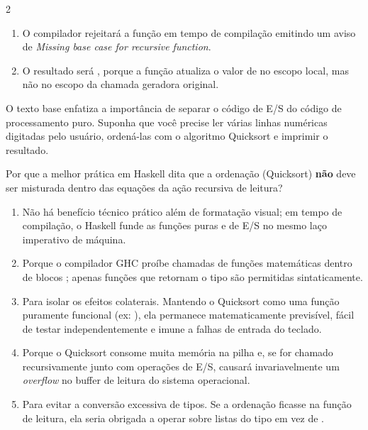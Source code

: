 \documentclass[a4paper,10pt,brazil]{article}
\begin{document}
\begin{multicols}{2}
\begin{enumerate}
  \item O compilador rejeitará a função  em tempo de compilação emitindo um aviso de \emph{Missing base case for recursive function}.

  \item O resultado será \haskellinline{[10, 10, 10]}, porque a função atualiza o valor de  no escopo local, mas não no escopo da chamada geradora original.


\end{enumerate}

O texto base enfatiza a importância de separar o código de E/S do código de processamento puro. Suponha que você precise ler várias linhas numéricas digitadas pelo usuário, ordená-las com o algoritmo Quicksort e imprimir o resultado. 

Por que a melhor prática em Haskell dita que a ordenação (Quicksort) \textbf{não} deve ser misturada dentro das equações da ação recursiva de leitura?

\begin{enumerate}
  \item Não há benefício técnico prático além de formatação visual; em tempo de compilação, o Haskell funde as funções puras e de E/S no mesmo laço imperativo de máquina.

  \item Porque o compilador GHC proíbe chamadas de funções matemáticas dentro de blocos ; apenas funções que retornam o tipo  são permitidas sintaticamente.

  \item Para isolar os efeitos colaterais. Mantendo o Quicksort como uma função puramente funcional (ex: \haskellinline{[Int] -> [Int]}), ela permanece matematicamente previsível, fácil de testar independentemente e imune a falhas de entrada do teclado.

  \item Porque o Quicksort consome muita memória na pilha e, se for chamado recursivamente junto com operações de E/S, causará invariavelmente um \emph{overflow} no buffer de leitura do sistema operacional.

  \item Para evitar a conversão excessiva de tipos. Se a ordenação ficasse na função de leitura, ela seria obrigada a operar sobre listas do tipo \haskellinline{[IO Int]} em vez de \haskellinline{[Int]}.



\end{enumerate}
\end{multicols}
\end{document}
